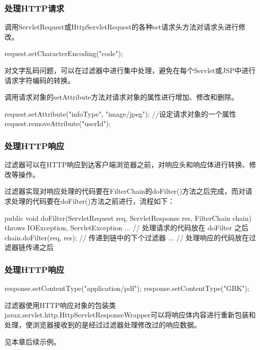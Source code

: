 \begin{frame}[fragile] %
\frametitle{处理HTTP请求} 


调用ServletRequest或HttpServletRequest的各种set请求头方法对请求头进行修改。

\begin{javaCode}
request.setCharacterEncoding("code");  
\end{javaCode}

{\kai 对文字乱码问题，可以在过滤器中进行集中处理，避免在每个Servlet或JSP中进行请求字符编码的转换。}


调用请求对象的setAttribute方法对请求对象的属性进行增加、修改和删除。

\begin{javaCode}
request.setAttribute("infoType", "image/jpeg"); //设定请求对象的一个属性
request.removeAttribute("userId");
\end{javaCode}

\end{frame}

\begin{frame}[fragile] %
\frametitle{处理HTTP响应} 

过滤器可以在HTTP响应到达客户端浏览器之前，对响应头和响应体进行转换、修改等操作。

过滤器实现对响应处理的代码要在FilterChain的doFilter()方法之后完成，而对请求处理的代码要在doFilter()方法之前进行，流程如下：

\begin{javaCode}
public void doFilter(ServletRequest req, ServletResponse res, FilterChain chain) 
    throws IOException, ServletException {
  ...  // 处理请求的代码放在 doFilter 之后
  chain.doFilter(req, res); // 传递到链中的下个过滤器
  ...  // 处理响应的代码放在过滤器链传递之后
}  
\end{javaCode}
\end{frame}

\begin{frame}[fragile] %
\frametitle{处理HTTP响应} 


\begin{javaCode}
response.setContentType("application/pdf");
response.setContentType("GBK");
\end{javaCode}


过滤器使用HTTP响应对象的包装类javax.servlet.http.HttpServletResponseWrapper可以将响应体内容进行重新包装和处理，使浏览器接收到的是经过过滤器处理修改过的响应数据。

见本章后续示例。
\end{frame}

